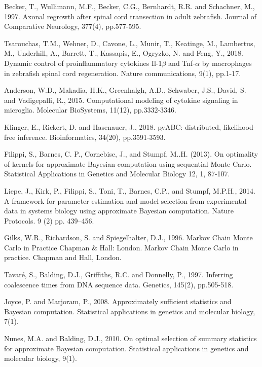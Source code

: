 \documentclass[12pt,a4paper]{report}
\begin{document}
\begin{thebibliography}{100}

     Becker, T., Wullimann, M.F., Becker, C.G., Bernhardt, R.R. and Schachner, M., 1997. Axonal regrowth after spinal cord transection in adult zebrafish. Journal of Comparative Neurology, 377(4), pp.577-595.

     Tsarouchas, T.M., Wehner, D., Cavone, L., Munir, T., Keatinge, M., Lambertus, M., Underhill, A., Barrett, T., Kassapis, E., Ogryzko, N. and Feng, Y., 2018. Dynamic control of proinflammatory cytokines Il-1$\beta$ and Tnf-$\alpha$ by macrophages in zebrafish spinal cord regeneration. Nature communications, 9(1), pp.1-17.

     Anderson, W.D., Makadia, H.K., Greenhalgh, A.D., Schwaber, J.S., David, S. and Vadigepalli, R., 2015. Computational modeling of cytokine signaling in microglia. Molecular BioSystems, 11(12), pp.3332-3346.

     Klinger, E., Rickert, D. and Hasenauer, J., 2018. pyABC: distributed, likelihood-free inference. Bioinformatics, 34(20), pp.3591-3593.

     Filippi, S., Barnes, C. P., Cornebise, J., and Stumpf, M..H. (2013). On optimality of kernels for approximate Bayesian computation using sequential Monte Carlo. Statistical Applications in Genetics and Molecular Biology 12, 1, 87-107.

     Liepe, J., Kirk, P., Filippi, S., Toni, T., Barnes, C.P., and Stumpf, M.P.H., 2014. A framework for parameter estimation and model selection from experimental data in systems biology using approximate Bayesian computation. Nature Protocols. 9 (2) pp. 439–456.

     Gilks, W.R., Richardson, S. and Spiegelhalter, D.J., 1996. Markov Chain Monte Carlo in Practice Chapman \& Hall: London. Markov Chain Monte Carlo in practice. Chapman and Hall, London.

     Tavaré, S., Balding, D.J., Griffiths, R.C. and Donnelly, P., 1997. Inferring coalescence times from DNA sequence data. Genetics, 145(2), pp.505-518.

     Joyce, P. and Marjoram, P., 2008. Approximately sufficient statistics and Bayesian computation. Statistical applications in genetics and molecular biology, 7(1).

     Nunes, M.A. and Balding, D.J., 2010. On optimal selection of summary statistics for approximate Bayesian computation. Statistical applications in genetics and molecular biology, 9(1).


\end{thebibliography}
\end{document}
